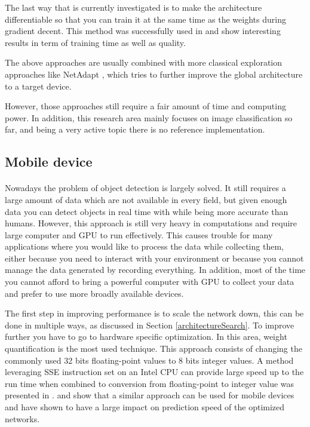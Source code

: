 The last way that is currently investigated is to make the architecture differentiable so that you can train it at the same time as the weights during gradient decent. This method was successfully used in \cite{liu2018darts} and show interesting results in term of training time as well as quality.

The above approaches are usually combined with more classical exploration approaches like NetAdapt \cite{yang2018netadapt}, which tries to further improve the global architecture to a target device. 

However, those approaches still require a fair amount of time and computing power. In addition, this research area mainly focuses on image classification so far, and being a very active topic there is no reference implementation.

\subsection{Mobile device} \label{subsec:optMobileDevice}
\paragraph{}
Nowadays the problem of object detection is largely solved. It still requires a large amount of data which are not available in every field, but given enough data you can detect objects in real time with while being more accurate than humans. However, this approach is still very heavy in computations and require large computer and GPU to run effectively. This causes trouble for many applications where you would like to process the data while collecting them, either because you need to interact with your environment or because you cannot manage the data generated by recording everything. In addition, most of the time you cannot afford to bring a powerful computer with GPU to collect your data and prefer to use more broadly available devices.

The first step in improving performance is to scale the network down, this can be done in multiple ways, as discussed in Section \ref{architectureSearch}. To improve further you have to go to hardware specific optimization. In this area, weight quantification is the most used technique. This approach consists of changing the commonly used 32 bits floating-point values to 8 bits integer values. A method leveraging SSE instruction set on an Intel CPU can provide large speed up to the run time when combined to conversion from floating-point to integer value was presented in \cite{vanhoucke2011improving}. \cite{jacob2017quantization} and \cite{gysel2016hardwareoriented} show that a similar approach can be used for mobile devices and have shown to have a large impact on prediction speed of the optimized networks.

